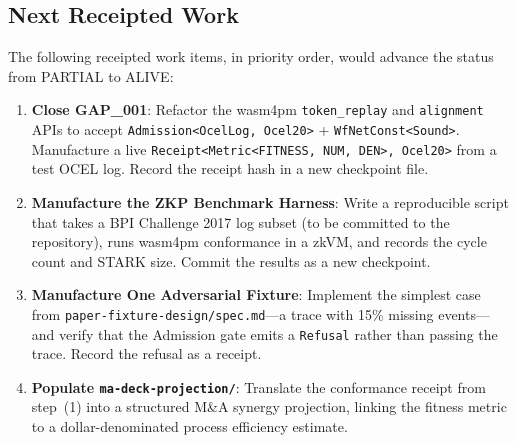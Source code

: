 \subsection{Next Receipted Work}
\label{sec:experiments-core-open-next}

The following receipted work items, in priority order, would advance the status from
PARTIAL to ALIVE:

\begin{enumerate}
  \item \textbf{Close GAP\_001}: Refactor the wasm4pm \texttt{token\_replay} and
    \texttt{alignment} APIs to accept \texttt{Admission<OcelLog, Ocel20>} +
    \texttt{WfNetConst<Sound>}. Manufacture a live \texttt{Receipt<Metric<FITNESS, NUM, DEN>, Ocel20>}
    from a test OCEL log. Record the receipt hash in a new checkpoint file.
  \item \textbf{Manufacture the ZKP Benchmark Harness}: Write a reproducible script
    that takes a BPI Challenge 2017 log subset (to be committed to the repository),
    runs wasm4pm conformance in a zkVM, and records the cycle count and STARK size.
    Commit the results as a new checkpoint.
  \item \textbf{Manufacture One Adversarial Fixture}: Implement the simplest case
    from \texttt{paper-fixture-design/spec.md}---a trace with 15\% missing events---and
    verify that the Admission gate emits a \texttt{Refusal} rather than passing the
    trace. Record the refusal as a receipt.
  \item \textbf{Populate \texttt{ma-deck-projection/}}: Translate the conformance
    receipt from step~(1) into a structured M\&A synergy projection, linking the
    fitness metric to a dollar-denominated process efficiency estimate.
\end{enumerate}
